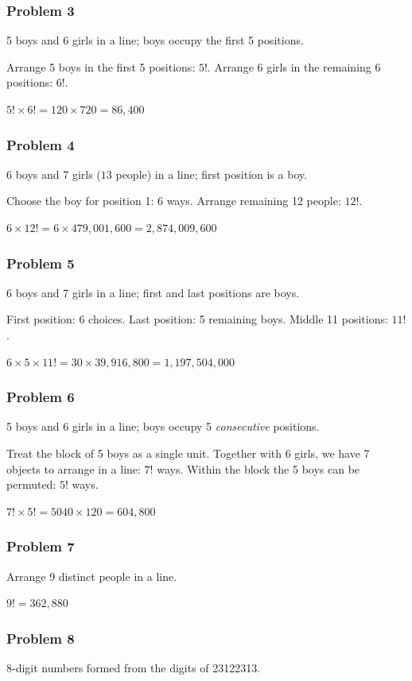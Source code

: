 \subsubsection*{Problem 3}
5 boys and 6 girls in a line; boys occupy the first 5 positions.

Arrange 5 boys in the first 5 positions: $5!$.
Arrange 6 girls in the remaining 6 positions: $6!$.

$\boxed{5! \times 6! = 120 \times 720 = 86{,}400}$

\subsubsection*{Problem 4}
6 boys and 7 girls ($13$ people) in a line; first position is a boy.

Choose the boy for position 1: 6 ways. Arrange remaining 12 people: $12!$.

$\boxed{6 \times 12! = 6 \times 479{,}001{,}600 = 2{,}874{,}009{,}600}$

\subsubsection*{Problem 5}
6 boys and 7 girls in a line; first and last positions are boys.

First position: 6 choices. Last position: 5 remaining boys. Middle 11 positions: $11!$.

$\boxed{6 \times 5 \times 11! = 30 \times 39{,}916{,}800 = 1{,}197{,}504{,}000}$

\subsubsection*{Problem 6}
5 boys and 6 girls in a line; boys occupy 5 \emph{consecutive} positions.

Treat the block of 5 boys as a single unit. Together with 6 girls, we have 7 objects to arrange in a line: $7!$ ways. Within the block the 5 boys can be permuted: $5!$ ways.

$\boxed{7! \times 5! = 5040 \times 120 = 604{,}800}$

\subsubsection*{Problem 7}
Arrange 9 distinct people in a line.

$\boxed{9! = 362{,}880}$

\subsubsection*{Problem 8}
8-digit numbers formed from the digits of 23122313.


